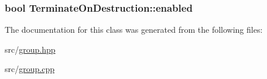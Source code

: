 \subsubsection[{\texorpdfstring{enabled}{enabled}}]{\setlength{\rightskip}{0pt plus 5cm}bool Terminate\+On\+Destruction\+::enabled\hspace{0.3cm}{\ttfamily [private]}}\hypertarget{class_terminate_on_destruction_a17854fe56e131d017df98b77f9c4cbfc}{}\label{class_terminate_on_destruction_a17854fe56e131d017df98b77f9c4cbfc}


The documentation for this class was generated from the following files\+:\begin{DoxyCompactItemize}
\item 
src/\hyperlink{group_8hpp}{group.\+hpp}\item 
src/\hyperlink{group_8cpp}{group.\+cpp}\end{DoxyCompactItemize}

